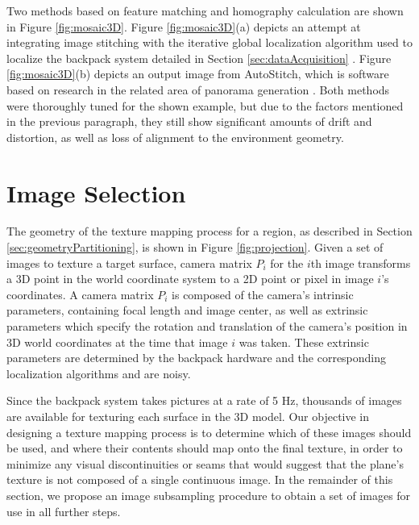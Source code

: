 \documentclass[]{spie}  %
\begin{document}
Two methods based on feature matching and homography calculation are
shown in Figure \ref{fig:mosaic3D}. Figure \ref{fig:mosaic3D}(a)
depicts an attempt at integrating image stitching with the iterative
global localization algorithm used to localize the backpack system
detailed in Section \ref{sec:dataAcquisition}
\cite{liu2010indoor}. Figure \ref{fig:mosaic3D}(b) depicts an output
image from AutoStitch, which is software based on research in the
related area of panorama generation \cite{panorama2d,
  autostitch}. Both methods were thoroughly tuned for the shown
example, but due to the factors mentioned in the previous paragraph,
they still show significant amounts of drift and distortion, as well
as loss of alignment to the environment geometry.

\section{Image Selection}
\label{sec:imageSelection}

The geometry of the texture mapping process for a region, as described
in Section \ref{sec:geometryPartitioning}, is shown in Figure
\ref{fig:projection}. Given a set of images to texture a target
surface, camera matrix $P_i$ for the $i$th image transforms a 3D point
in the world coordinate system to a 2D point or pixel in image $i$'s
coordinates. A camera matrix $P_i$ is composed of the camera's
intrinsic parameters, containing focal length and image center, as
well as extrinsic parameters which specify the rotation and
translation of the camera's position in 3D world coordinates at the
time that image $i$ was taken. These extrinsic parameters are
determined by the backpack hardware and the corresponding localization
algorithms \cite{chen2010indoor, liu2010indoor, kua2012loopclosure}
and are noisy.

Since the backpack system takes pictures at a rate of 5 Hz, thousands
of images are available for texturing each surface in the 3D
model. Our objective in designing a texture mapping process is to
determine which of these images should be used, and where their
contents should map onto the final texture, in order to minimize any
visual discontinuities or seams that would suggest that the plane's
texture is not composed of a single continuous image. In the remainder
of this section, we propose an image subsampling procedure to obtain a
set of images for use in all further steps.
\end{document}
